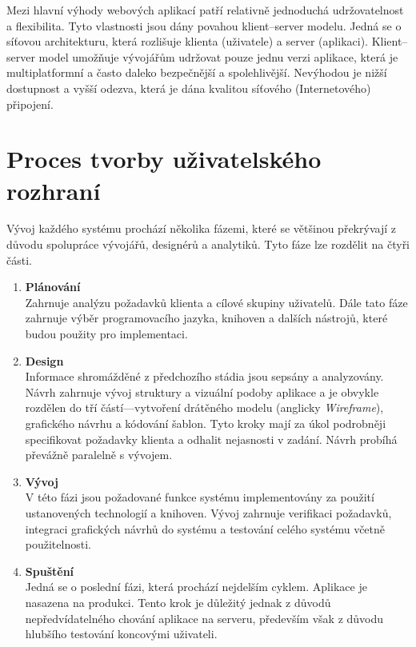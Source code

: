 Mezi hlavní výhody webových aplikací patří relativně jednoduchá udržovatelnost a flexibilita. Tyto vlastnosti jsou dány povahou klient--server modelu. Jedná se o síťovou architekturu, která rozlišuje klienta (uživatele) a server (aplikaci). Klient--server model umožňuje vývojářům udržovat pouze jednu verzi aplikace, která je multiplatformní a často daleko bezpečnější a spolehlivější. Nevýhodou je nižší dostupnost a vyšší odezva, která je dána kvalitou síťového (Internetového) připojení.

\section{Proces tvorby uživatelského rozhraní}
\label{sec:process}

\begin{quote}
\end{quote}

\noindent
Vývoj každého systému prochází několika fázemi, které se většinou překrývají z důvodu spolupráce vývojářů, designérů a analytiků. Tyto fáze lze rozdělit na čtyři části.

\begin{enumerate}[leftmargin=1cm]
    \item \textbf{Plánování}\\
          Zahrnuje analýzu požadavků klienta a cílové skupiny uživatelů. Dále tato fáze zahrnuje výběr programovacího jazyka, knihoven a dalších nástrojů, které budou použity pro implementaci.

    \item \textbf{Design}\\
          Informace shromážděné z předchozího stádia jsou sepsány a analyzovány. Návrh zahrnuje vývoj struktury a vizuální podoby aplikace a je obvykle rozdělen do tří částí---vytvoření drátěného modelu (anglicky \textit{Wireframe}), grafického návrhu a kódování šablon. Tyto kroky mají za úkol podrobněji specifikovat požadavky klienta a odhalit nejasnosti v zadání. Návrh probíhá převážně paralelně s vývojem.

    \item \textbf{Vývoj}\\
          V této fázi jsou požadované funkce systému implementovány za použití ustanovených technologií a knihoven. Vývoj zahrnuje verifikaci požadavků, integraci grafických návrhů do systému a testování celého systému včetně použitelnosti.

    \item \textbf{Spuštění}\\
           Jedná se o poslední fázi, která prochází nejdelším cyklem. Aplikace je nasazena na produkci. Tento krok je důležitý jednak z důvodů nepředvídatelného chování aplikace na serveru, především však z důvodu hlubšího testování koncovými uživateli.

\end{enumerate}

